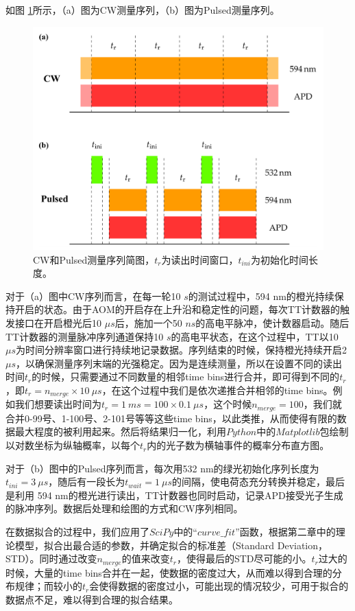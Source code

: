 \documentclass[type = bachelor, oneside]{whu-thesis}
\begin{document}
如图 \ref{fig: Measurement Sequence}所示，（a）图为CW测量序列，（b）图为Pulsed测量序列。
\begin{figure}
  \centering
  \includegraphics[width=1.0\textwidth]{figures/Chapter 2/Measurement Sequence.png}
  \caption[CW和Pulsed测量序列简图]{CW和Pulsed测量序列简图，$t_r$为读出时间窗口，$t_{ini}$为初始化时间长度。}
  \label{fig: Measurement Sequence}
\end{figure}

对于（a）图中CW序列而言，在每一轮10 $s$的测试过程中，594 nm的橙光持续保持开启的状态。由于AOM的开启存在上升沿和稳定性的问题，每次TT计数器的触发接口在开启橙光后10 $\mu s$后，施加一个50 $ns$的高电平脉冲，使计数器启动。随后TT计数器的测量脉冲序列通道保持10 $s$的高电平状态，在这个过程中，TT以10 $\mu s$为时间分辨率窗口进行持续地记录数据。序列结束的时候，保持橙光持续开启2 $\mu s$，以确保测量序列末端的光强稳定。因为是连续测量，所以在设置不同的读出时间$t_r$的时候，只需要通过不同数量的相邻time bins进行合并，即可得到不同的$t_r$，即$t_r = n_{merge} \times 10\ \mu s$，在这个过程中我们是依次递推合并相邻的time bins。例如我们想要读出时间为$t_r = 1\ ms=100 \times 0.1\ \mu s$，这个时候$n_{merge} = 100$，我们就合并0-99号、1-100号、2-101号等等这些time bins，以此类推，从而使得有限的数据最大程度的被利用起来。然后将结果归一化，利用$Python$中的$Matplotlib$包绘制以对数坐标为纵轴概率，以每个$t_r$内的光子数为横轴事件的概率分布直方图。

对于（b）图中的Pulsed序列而言，每次用532 nm的绿光初始化序列长度为$t_{ini} = 3\ \mu s$，随后有一段长为$t_{wait} = 1\ \mu s$的间隔，使电荷态充分转换并稳定，最后是利用 594 nm的橙光进行读出，TT计数器也同时启动，记录APD接受光子生成的脉冲序列。数据后处理和绘图的方式和CW序列相同。

在数据拟合的过程中，我们应用了$SciPy$中的“$curve\_fit$”函数，根据第二章中的理论模型，拟合出最合适的参数，并确定拟合的标准差（Standard Deviation，STD）。同时通过改变$n_{merge}$的值来改变$t_r$，使得最后的STD尽可能的小。$t_r$过大的时候，大量的time bins合并在一起，使数据的密度过大，从而难以得到合理的分布规律；而较小的$t_r$会使得数据的密度过小，可能出现的情况较少，可用于拟合的数据点不足，难以得到合理的拟合结果。

 
\end{document}

